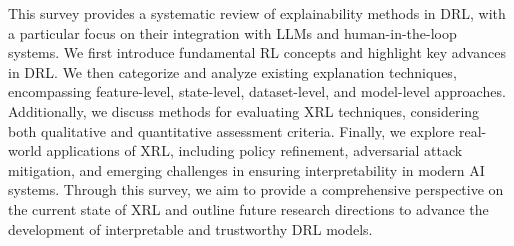 This survey provides a systematic review of explainability methods in DRL, with a particular focus on their integration with LLMs and human-in-the-loop systems. We first introduce fundamental RL concepts and highlight key advances in DRL. We then categorize and analyze existing explanation techniques, encompassing feature-level, state-level, dataset-level, and model-level approaches. Additionally, we discuss methods for evaluating XRL techniques, considering both qualitative and quantitative assessment criteria. Finally, we explore real-world applications of XRL, including policy refinement, adversarial attack mitigation, and emerging challenges in ensuring interpretability in modern AI systems. Through this survey, we aim to provide a comprehensive perspective on the current state of XRL and outline future research directions to advance the development of interpretable and trustworthy DRL models.